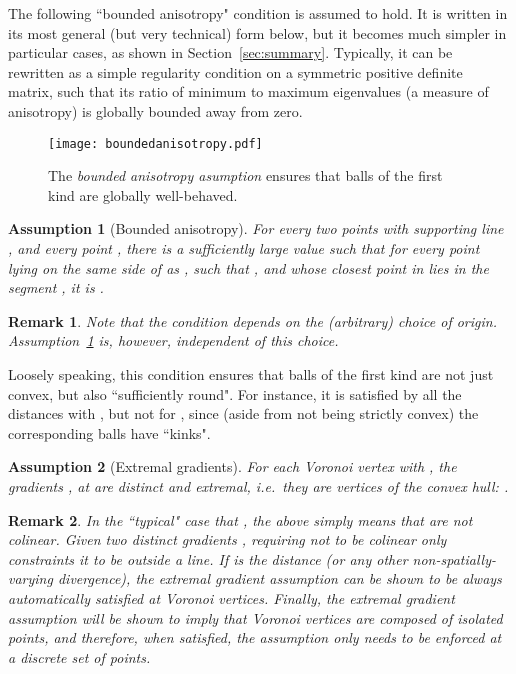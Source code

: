\documentclass[11pt]{article}
\newtheorem{assumption}{Assumption}
\newtheorem{remark}{Remark}
\begin{document}
The following ``bounded anisotropy" condition is assumed to hold. 
It is written in its most general (but very technical) form below, 
	but it becomes much simpler in particular cases, as shown in Section~\ref{sec:summary}. 
Typically, it can be rewritten as a simple regularity condition on a symmetric positive definite matrix, 
	such that its ratio of minimum to maximum eigenvalues
	(a measure of anisotropy) is globally bounded away from zero. 


\begin{figure}[thb]
\centering
\texttt{[image: boundedanisotropy.pdf]}
\caption{The \emph{bounded anisotropy asumption} ensures that balls of the first kind are globally well-behaved. }
\label{fig:gamma}
\end{figure}


\begin{assumption}[Bounded anisotropy]\label{ass:BAA}
For every two points  with supporting line , and every point , 
	there is a sufficiently large value  such that 
	for every point  lying on the same side of  as , 
		such that , and 
		whose closest point  in  lies in the segment , 
	it is . 
\end{assumption}
\begin{remark}
Note that the condition  depends on the (arbitrary) choice of origin. 
Assumption~\ref{ass:BAA} is, however, independent of this choice. 
\end{remark}
Loosely speaking, this condition ensures that balls of the first kind are 
	not just convex, but also ``sufficiently round". 
For instance, it is satisfied by all the  distances with , 
	but not for , since (aside from not being strictly convex) the corresponding balls have ``kinks". 



\begin{assumption}[Extremal gradients]\label{ass:EGA}
	For each Voronoi vertex  with , 
		the gradients , at  are distinct and extremal, 
		i.e.\ they are vertices of the convex hull:  . 
\end{assumption}

\begin{remark}
	In the ``typical" case that , the above simply means that  are not colinear. 
	Given two distinct gradients , requiring  not to be colinear only constraints it 
		to be outside a line.  
	If  is the  distance  (or any other non-spatially-varying divergence), 
	the extremal gradient assumption can be shown to be always automatically satisfied at Voronoi vertices. 
	Finally, the extremal gradient assumption will be shown to imply that Voronoi vertices are composed of isolated points, 
		and therefore, when satisfied, the assumption only needs to be enforced at a discrete set of points. 
\end{remark}
\end{document}
